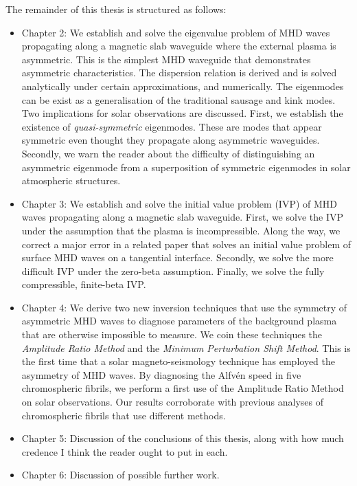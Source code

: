 \documentclass[12pt]{../style-files/ociamthesis}
\begin{document}
The remainder of this thesis is structured as follows:
\begin{itemize}
	\item Chapter 2: We establish and solve the eigenvalue problem of MHD waves propagating along a magnetic slab waveguide where the external plasma is asymmetric. This is the simplest MHD waveguide that demonstrates asymmetric characteristics. The dispersion relation is derived and is solved analytically under certain approximations, and numerically. The eigenmodes can be exist as a generalisation of the traditional sausage and kink modes. Two implications for solar observations are discussed. First, we establish the existence of \textit{quasi-symmetric} eigenmodes. These are modes that appear symmetric even thought they propagate along asymmetric waveguides. Secondly, we warn the reader about the difficulty of distinguishing an asymmetric eigenmode from a superposition of symmetric eigenmodes in solar atmospheric structures.
	\item Chapter 3: We establish and solve the initial value problem (IVP) of MHD waves propagating along a magnetic slab waveguide. First, we solve the IVP under the assumption that the plasma is incompressible. Along the way, we correct a major error in a related paper that solves an initial value problem of surface MHD waves on a tangential interface. Secondly, we solve the more difficult IVP under the zero-beta assumption. Finally, we solve the fully compressible, finite-beta IVP.
	\item Chapter 4: We derive two new inversion techniques that use the symmetry of asymmetric MHD waves to diagnose parameters of the background plasma that are otherwise impossible to measure. We coin these techniques the \textit{Amplitude Ratio Method} and the \textit{Minimum Perturbation Shift Method}. This is the first time that a solar magneto-seismology technique has employed the asymmetry of MHD waves. By diagnosing the Alfv\'{e}n speed in five chromospheric fibrils, we perform a first use of the Amplitude Ratio Method on solar observations. Our results corroborate with previous analyses of chromospheric fibrils that use different methods.
	\item Chapter 5: Discussion of the conclusions of this thesis, along with how much credence I think the reader ought to put in each.
	\item Chapter 6: Discussion of possible further work.
\end{itemize}



  
\end{document}
